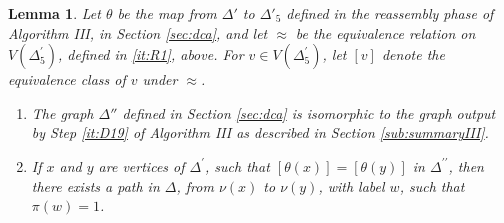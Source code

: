 \documentclass[a4paper,12pt]{article}
\newcommand{\D}{\Delta }
\newtheorem{lemma}[theorem]{Lemma}
\numberwithin{equation}{section}
\numberwithin{figure}{section}
\newcommand{\be}{\begin{enumerate}}
\newcommand{\ee}{\end{enumerate}}
\begin{document}
\begin{lemma}\label{lem:idverts}
Let $\theta$ be the map from $\D'$ to $\D'_5$ defined in the reassembly
phase of Algorithm III, in Section \ref{sec:dca}, and 
let $\approx$ be the equivalence relation on $V(\D^\prime_5)$, defined 
in \ref{it:R1}, above. For $v\in V(\D^\prime_5)$, 
let $[v]$ denote the equivalence class of $v$ under $\approx$. 
\be
\item
The graph $\D''$ defined in Section \ref{sec:dca} is isomorphic
to the graph output by  Step \ref{it:D19} of Algorithm III as described in
Section \ref{sub:summaryIII}. 
\item
If $x$ and $y$ are vertices of $\D^\prime$, such that
$[\theta(x)]= [\theta(y)]$ in $\D^{\prime\prime}$, then
there exists a path in $\D$, from $\nu(x)$ to $\nu(y)$, with label $w$,
such that $\pi(w)=1$.
\ee
\end{lemma}
\end{document}
